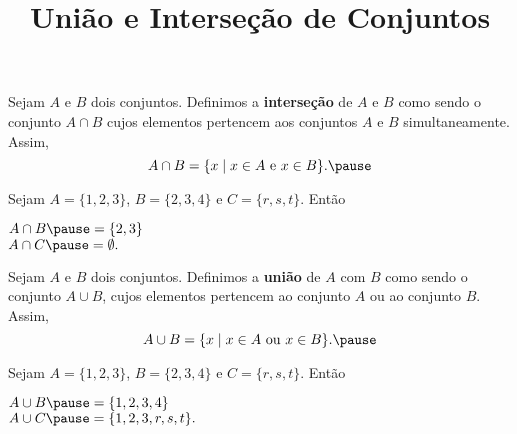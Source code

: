 \documentclass{beamer}
\title{Uni\~ao e Interse\c{c}\~ao de Conjuntos}
\author[\autor]{\autor}
\institute[\instituto]{\instituto}
\date{}
\begin{document}
    \begin{frame}
        \maketitle
    \end{frame}


    \begin{frame}
        \begin{definicao}
            Sejam $A$ e $B$ dois conjuntos. Definimos a \textbf{interse{\c c}{\~a}o} de $A$ e $B$ \pause como sendo o conjunto $A \cap B$ \pause cujos elementos pertencem aos conjuntos $A$ e $B$ simultaneamente. \pause Assim,
            \[
                A \cap B = \{x \mid x \in A\mbox{ e }  x \in B\}.\pause
            \]
        \end{definicao}

        \begin{exemplo}
            Sejam $A = \{1, 2, 3\}$, \pause $B = \{2, 3, 4\}$ \pause e $C = \{r, s, t\}$. \pause Ent\~ao\pause
            \begin{center}
                $A \cap B \pause = \{2, 3\}$\pause\\
                $A \cap C \pause = \emptyset.$\pause
            \end{center}
        \end{exemplo}

    \end{frame}

    \begin{frame}
        \begin{definicao}
            Sejam $A$ e $B$ dois conjuntos. \pause Definimos a \textbf{uni{\~a}o} de $A$ com $B$ \pause como sendo o conjunto $A \cup B$, \pause cujos elementos pertencem ao conjunto $A$ ou ao conjunto $B$. \pause Assim,\pause
            \[
                A \cup B = \{x \mid x \in A \mbox{ ou } x \in B\}.\pause
            \]
        \end{definicao}

        \begin{exemplo}
            Sejam $A = \{1, 2, 3\}$, \pause $B = \{2, 3, 4\}$ \pause e $C = \{r, s, t\}$. \pause Ent\~ao\pause
            \begin{center}
                $A \cup B \pause = \{1,2,3,4\}$\pause\\
                $A \cup C \pause = \{1,2,3,r,s,t\}.$\pause
            \end{center}
        \end{exemplo}
    \end{frame}
\end{document}
